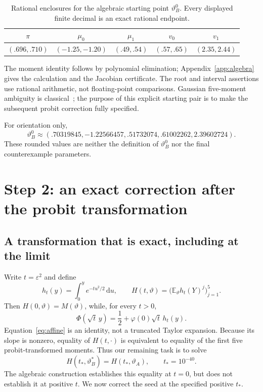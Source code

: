 \documentclass[11pt,a4paper]{article}
\numberwithin{equation}{section}
\newcommand{\E}{\mathbb E}
\newcommand{\vt}{\vartheta}
\newcommand{\ph}{\varphi}
\newcommand{\dd}{\,\mathrm d}
\begin{document}
\begin{table}[ht]
\centering
\caption{Rational enclosures for the algebraic starting point $\vt_B^0$. Every displayed finite decimal is an exact rational endpoint.}\label{tab:seed}
\begin{tabular}{@{}ccccc@{}}\toprule
$\pi$&$\mu_0$&$\mu_1$&$v_0$&$v_1$\\\midrule
$(.696,.710)$&$(-1.25,-1.20)$&$(.49,.54)$&$(.57,.65)$&$(2.35,2.44)$\\\bottomrule
\end{tabular}
\end{table}

The moment identity follows by polynomial elimination; Appendix~\ref{app:algebra} gives the calculation and the Jacobian certificate. The root and interval assertions use rational arithmetic, not floating-point comparisons. Gaussian five-moment ambiguity is classical~\cite{afs}; the purpose of this explicit starting pair is to make the subsequent probit correction fully specified.

For orientation only,
\[
 \vt_B^0\approx(.70319845,-1.22566457,.51732074,.61002262,2.39602724).
\]
These rounded values are neither the definition of $\vt_B^0$ nor the final counterexample parameters.

\section{Step 2: an exact correction after the probit transformation}\label{sec:correction}
\subsection{A transformation that is exact, including at the limit}
Write $t=\varepsilon^2$ and define
\begin{equation}\label{eq:H}
 h_t(y)=\int_0^y e^{-tu^2/2}\dd u,\qquad
 H(t,\vt)=\bigl(\E_\vt h_t(Y)^j\bigr)_{j=1}^5.
\end{equation}
Then $H(0,\vt)=M(\vt)$, while, for every $t>0$,
\begin{equation}\label{eq:affine}
 \Phi(\sqrt t\,y)=\frac12+\ph(0)\sqrt t\,h_t(y).
\end{equation}
Equation~\eqref{eq:affine} is an identity, not a truncated Taylor expansion. Because its slope is nonzero, equality of $H(t,\cdot)$ is equivalent to equality of the first five probit-transformed moments. Thus our remaining task is to solve
\begin{equation}\label{eq:target}
 H(t_*,\vt_B^*)=H(t_*,\vt_A),\qquad t_*=10^{-40}.
\end{equation}
The algebraic construction establishes this equality at $t=0$, but does not establish it at positive $t$. We now correct the seed at the specified positive $t_*$.
\end{document}
